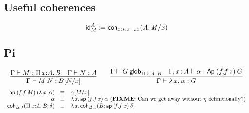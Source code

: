 
\subsection{Useful coherences}

\[\mathsf{id}^{A}_{M}:=\mathsf{coh}_{x:\mathord{*}.x =_{\mathord{*}} x} \mathit{(A;M/x)}\]

\subsection{Pi}

\begin{small}
  \[
  \infer{\ofglob{\Gamma}{\app{M}{N}}{\subst{B}{N}{x}}}
  {\ofglob{\Gamma}{M}{\picl{x}{A}{B}} & \ofglob{\Gamma}{N}{A}} \qquad
  \infer{\ofglob{\Gamma}{\ulam{x}{\alpha}}{G}}
  {\wfglob{\Gamma}{G}{n}{\picl{x}{A}{B}} &
    \ofglob{\Gamma,\tptm{x}{A}}{\alpha}{\Ap{(f.\app{f}{x})}{G}}}
  \]
\[
  \begin{array}{rcl}
  \mathsf{ap} \: {(f.\mathit{f \: M})} \: {(\mathit{\lambda\,x.\,\alpha})} & \equiv & \mathit{\alpha} [ M/x ] \\

\alpha & \equiv & \mathit{\lambda\,x.\,\mathsf{ap} \: {(f.\mathit{f \: x})} \: {\alpha}} \text{ (\textbf{FIXME:} Can we get away without $\eta$ definitionally?)} \\

\mathsf{coh}_{\Delta.J} \mathit{(\textnormal{$\Pi$}\,\mathit{x} \mathit{:} \mathit{A}.\,\mathit{B};\delta)} & \equiv & \mathit{\lambda\,x.\,\mathsf{coh}_{\Delta.J} \mathit{(B;\mathsf{ap} \: {(f.\mathit{f \: x})} \: {\delta})}} \\
 
\end{array}
\]
\end{small}

